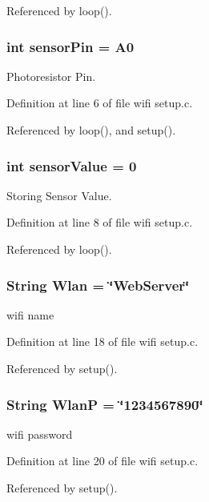 Referenced by loop().
\subsubsection{\setlength{\rightskip}{0pt plus 5cm}int {\bf sensor\-Pin} = A0}\label{wifi_01setup_8c_6aec6a9612b22e1cec48b35427ba4a47}


Photoresistor Pin. 



Definition at line 6 of file wifi setup.c.

Referenced by loop(), and setup().
\subsubsection{\setlength{\rightskip}{0pt plus 5cm}int {\bf sensor\-Value} = 0}\label{wifi_01setup_8c_6ad49bffab166dc28073d341bf3caacb}


Storing Sensor Value. 



Definition at line 8 of file wifi setup.c.

Referenced by loop().
\subsubsection{\setlength{\rightskip}{0pt plus 5cm}String {\bf Wlan} = \char`\"{}Web\-Server\char`\"{}}\label{wifi_01setup_8c_60409476e8b89d8184cb4a12478eb2d8}


wifi name 



Definition at line 18 of file wifi setup.c.

Referenced by setup().
\subsubsection{\setlength{\rightskip}{0pt plus 5cm}String {\bf Wlan\-P} = \char`\"{}1234567890\char`\"{}}\label{wifi_01setup_8c_8f40303d7f1ad878da7f726d975bbf3d}


wifi password 



Definition at line 20 of file wifi setup.c.

Referenced by setup().